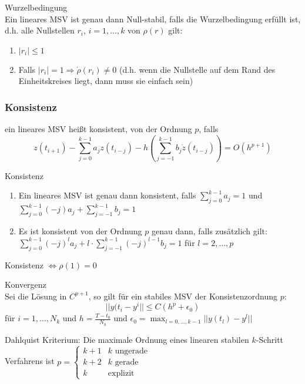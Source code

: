 \begin{theorem}
	Wurzelbedingung
	\\
	Ein lineares MSV ist genau dann Null-stabil, falls die Wurzelbedingung erfüllt ist, d.h. alle Nullstellen $r_{i}$, $i=1,\ldots,k$
	von $\rho(r)$ gilt:
	\begin{enumerate}
		\item $|r_{i}|\le 1$
		\item Falls $|r_{i}|=1\Rightarrow \dot \rho(r_{i})\not = 0$ (d.h. wenn die Nullstelle auf dem Rand des Einheitskreises liegt, dann muss sie einfach sein)
	\end{enumerate}
\end{theorem}

\subsubsection{Konsistenz}
\begin{definition}
	[Definition IV.10] ein lineares MSV heißt konsistent, von der Ordnung $p$, falls 
	$$z(t_{i+1})-\sum_{j=0}^{k-1}a_{j}z(t_{i-j})-h(\sum_{j=-1}^{k-1}b_{j}\dot z(t_{i-j}))=O(h^{p+1})$$
\end{definition}

\begin{theorem}
	Konsistenz
	\\
	\begin{enumerate}
		\item Ein lineares MSV ist genau dann konsistent, falls $\sum_{j=0}^{k-1}a_{j}=1$ und $\sum_{j=0}^{k-1}(-j)a_{j}+\sum_{j=-1}^{k-1}b_{j}=1$
		\item Es ist konsistent von der Ordnung $p$ genau dann, falls zusätzlich gilt: $\sum_{j=0}^{k-1}(-j)^{l}a_{j}+l\cdot \sum_{j=-1}^{k-1}(-j)^{l-1}b_{j}=1$ für $l=2,\ldots,p$
	\end{enumerate}
\end{theorem}

\begin{remark}
	Konsistenz $\Leftrightarrow \rho(1)=0$
\end{remark}

\begin{theorem}
	Konvergenz
	\\
	Sei die Lösung in $C^{p+1}$, so gilt für ein stabiles MSV der Konsistenzordnung $p$:
	$$||y(t_{i}-y^{i}||\le C(h^{p}+\epsilon_{0})$$
	für $i=1,\ldots,N_{k}$ und $h=\frac{T-t_{0}}{N_{h}}$ und $\epsilon_{0}=\max_{l=0,\ldots,k-1}||y(t_{l})-y^{l}||$
\end{theorem}

\begin{remark}
 Dahlquist Kriterium: Die maximale Ordnung eines linearen stabilen $k$-Schritt Verfahrens ist 
 $p=\begin{cases}
 	k+1&k \text{ ungerade}\\
 	k+2&k \text{ gerade}\\
 	k&\text{explizit}
 \end{cases}$
\end{remark}